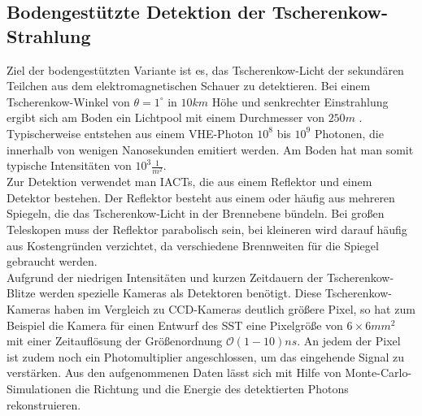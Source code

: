 \subsection{Bodengestützte Detektion der Tscherenkow-Strahlung}
Ziel der bodengestützten Variante ist es, das Tscherenkow-Licht der sekundären Teilchen aus dem elektromagnetischen Schauer zu detektieren. Bei einem Tscherenkow-Winkel von $\theta=1^{\circ}$ in $10\unit{km}$ Höhe und senkrechter Einstrahlung ergibt sich am Boden ein Lichtpool mit einem Durchmesser von $250\unit{m}$ \cite{DesignConcept}. %
Typischerweise entstehen aus einem VHE-Photon $10^8$ bis $10^9$ Photonen, die innerhalb von wenigen Nanosekunden emitiert werden. Am Boden hat man somit typische Intensitäten von $10^3\unit{\frac{1}{m^2}}$.\\%
Zur Detektion verwendet man IACTs, die aus einem Reflektor und einem Detektor bestehen. Der Reflektor besteht aus einem oder häufig aus mehreren Spiegeln, die das Tscherenkow-Licht in der Brennebene bündeln. Bei großen Teleskopen muss der Reflektor parabolisch sein, bei kleineren wird darauf häufig aus Kostengründen verzichtet, da verschiedene Brennweiten für die Spiegel gebraucht werden.\\
Aufgrund der niedrigen Intensitäten und kurzen Zeitdauern der Tscherenkow-Blitze werden spezielle Kameras als Detektoren benötigt. Diese Tscherenkow-Kameras haben im Vergleich zu CCD-Kameras deutlich größere Pixel, so hat zum Beispiel die Kamera für einen Entwurf des SST \cite{gct} eine Pixelgröße von $6 \times 6\unit{mm^2}$ mit einer Zeitauflösung der Größenordnung $\mathcal{O}(1-10)\unit{ns}$. An jedem der Pixel ist zudem noch ein Photomultiplier angeschlossen, um das eingehende Signal zu verstärken. Aus den aufgenommenen Daten lässt sich mit Hilfe von Monte-Carlo-Simulationen die Richtung und die Energie des detektierten Photons rekonstruieren. 

